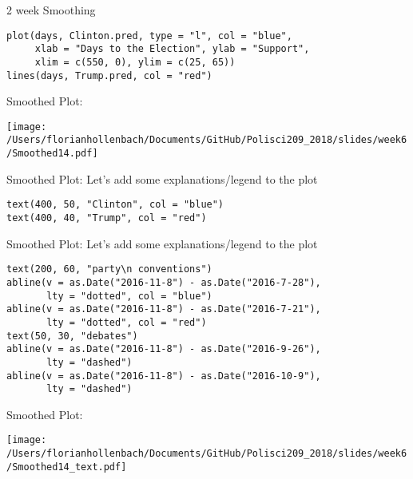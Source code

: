\documentclass[presentation]{beamer}
\begin{document}
\begin{frame}[fragile,label={sec:org6ad4325}]{2 week Smoothing}
 \begin{verbatim}
plot(days, Clinton.pred, type = "l", col = "blue",
     xlab = "Days to the Election", ylab = "Support",
     xlim = c(550, 0), ylim = c(25, 65))
lines(days, Trump.pred, col = "red")
\end{verbatim}
\end{frame}


\begin{frame}[label={sec:orgba27f7a}]{Smoothed Plot:}
\begin{center}
\texttt{[image: /Users/florianhollenbach/Documents/GitHub/Polisci209\_2018/slides/week6/Smoothed14.pdf]}
\end{center}
\end{frame}


\begin{frame}[fragile,label={sec:org618aded}]{Smoothed Plot:}
 Let's add some explanations/legend to the plot

\begin{verbatim}
text(400, 50, "Clinton", col = "blue")
text(400, 40, "Trump", col = "red")
\end{verbatim}
\end{frame}


\begin{frame}[fragile,shrink=25,label={sec:org010ea19}]{Smoothed Plot:}
 Let's add some explanations/legend to the plot

\begin{verbatim}
text(200, 60, "party\n conventions")
abline(v = as.Date("2016-11-8") - as.Date("2016-7-28"),
       lty = "dotted", col = "blue")
abline(v = as.Date("2016-11-8") - as.Date("2016-7-21"),
       lty = "dotted", col = "red")
text(50, 30, "debates")
abline(v = as.Date("2016-11-8") - as.Date("2016-9-26"),
       lty = "dashed")
abline(v = as.Date("2016-11-8") - as.Date("2016-10-9"),
       lty = "dashed")
\end{verbatim}
\end{frame}



\begin{frame}[label={sec:orgce93964}]{Smoothed Plot:}
\begin{center}
\texttt{[image: /Users/florianhollenbach/Documents/GitHub/Polisci209\_2018/slides/week6/Smoothed14\_text.pdf]}
\end{center}
\end{frame}
\end{document}
